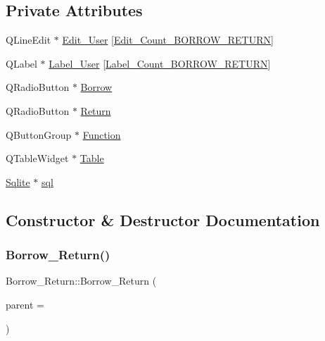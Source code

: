 \subsection*{Private Attributes}
\begin{DoxyCompactItemize}
\item 
Q\+Line\+Edit $\ast$ \mbox{\hyperlink{class_borrow___return_a6ed2efd5439bbcf4661a7c434d21b5ce}{Edit\+\_\+\+User}} \mbox{[}\mbox{\hyperlink{borrow__return_8h_a35b2fb4ddb399d5c884c4199466d78ce}{Edit\+\_\+\+Count\+\_\+\+B\+O\+R\+R\+O\+W\+\_\+\+R\+E\+T\+U\+RN}}\mbox{]}
\item 
Q\+Label $\ast$ \mbox{\hyperlink{class_borrow___return_aa7953f36d477f9beb724ee9201be083f}{Label\+\_\+\+User}} \mbox{[}\mbox{\hyperlink{borrow__return_8h_af38a41a002c7bb91d4bcdd0facb02fbe}{Label\+\_\+\+Count\+\_\+\+B\+O\+R\+R\+O\+W\+\_\+\+R\+E\+T\+U\+RN}}\mbox{]}
\item 
Q\+Radio\+Button $\ast$ \mbox{\hyperlink{class_borrow___return_a0b4d7c64ac6e275c1dce258f58ba82cd}{Borrow}}
\item 
Q\+Radio\+Button $\ast$ \mbox{\hyperlink{class_borrow___return_aca8210d22b3ccbeec32bb9ede58e2a37}{Return}}
\item 
Q\+Button\+Group $\ast$ \mbox{\hyperlink{class_borrow___return_a458f1acacd87199800d7fafa55768b1a}{Function}}
\item 
Q\+Table\+Widget $\ast$ \mbox{\hyperlink{class_borrow___return_a775ac295d8bdf70bac090e3a4aba5745}{Table}}
\item 
\mbox{\hyperlink{class_sqlite}{Sqlite}} $\ast$ \mbox{\hyperlink{class_borrow___return_acdc2c2126c57e62f2efbb7fae20347c4}{sql}}
\end{DoxyCompactItemize}


\subsection{Constructor \& Destructor Documentation}
\mbox{\label{class_borrow___return_a60ee7fbb6b774305fbd655bd362572c5}} 
\subsubsection{\texorpdfstring{Borrow\_Return()}{Borrow\_Return()}}
{\footnotesize\ttfamily Borrow\+\_\+\+Return\+::\+Borrow\+\_\+\+Return (\begin{DoxyParamCaption}\item[{Q\+Widget $\ast$}]{parent = {} }\end{DoxyParamCaption})\hspace{0.3cm}{\ttfamily [explicit]}}



